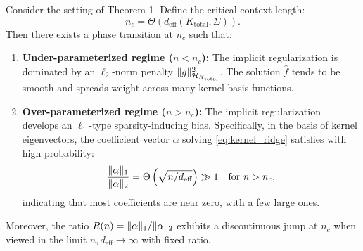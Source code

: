 	\begin{theorem}
		\label{thm:phase_transition}
		Consider the setting of Theorem 1. Define the critical context length:
		\begin{equation}
			n_c = \Theta\left(d_{\text{eff}}(K_{\text{total}}, \Sigma)\right).
			\label{eq:critical_n}
		\end{equation}
		Then there exists a phase transition at \(n_c\) such that:
		\begin{enumerate}
			\item \textbf{Under-parameterized regime (\(n < n_c\)):} The implicit regularization is dominated by an \(\ell_2\)-norm penalty \(\lVert g \rVert_{\mathcal{H}_{K_{\text{total}}}}^2\). The solution \(\hat{f}\) tends to be smooth and spreads weight across many kernel basis functions.
			
			\item \textbf{Over-parameterized regime (\(n > n_c\)):} The implicit regularization develops an \(\ell_1\)-type sparsity-inducing bias. Specifically, in the basis of kernel eigenvectors, the coefficient vector \(\alpha\) solving \eqref{eq:kernel_ridge} satisfies with high probability:
			\begin{equation}
				\frac{\lVert \alpha \rVert_1}{\lVert \alpha \rVert_2} = \Theta\left(\sqrt{n / d_{\text{eff}}}\right) \gg 1 \quad \text{for } n > n_c,
				\label{eq:sparsity_ratio}
			\end{equation}
			indicating that most coefficients are near zero, with a few large ones.
		\end{enumerate}
		Moreover, the ratio \(R(n) = \lVert \alpha \rVert_1 / \lVert \alpha \rVert_2\) exhibits a discontinuous jump at \(n_c\) when viewed in the limit \(n, d_{\text{eff}} \to \infty\) with fixed ratio.
	\end{theorem}
	
